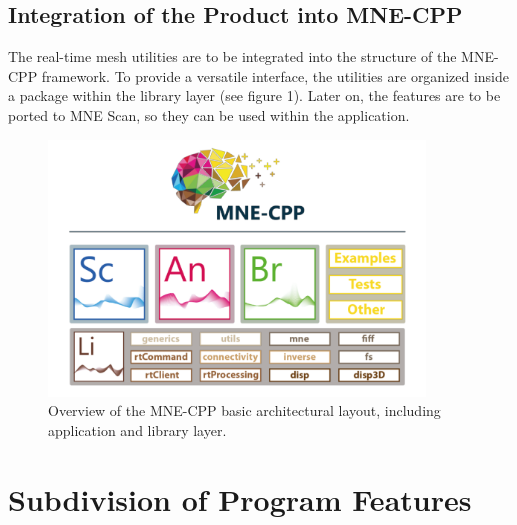 \subsection{Integration of the Product into MNE-CPP}

The real-time mesh utilities are to be integrated into the structure of the MNE-CPP framework. To provide a versatile interface, the utilities are organized inside a package within the library layer (see figure 1). Later on, the features are to be ported to MNE Scan, so they can be used within the application.
\begin{figure}[h]
	\begin{center}
		\includegraphics[width=10cm]{figures/mne_architecture.png}
		\caption{Overview of the MNE-CPP basic architectural layout, including application and library layer.}
	\end{center}
\end{figure}

\clearpage

\section{Subdivision of Program Features}

